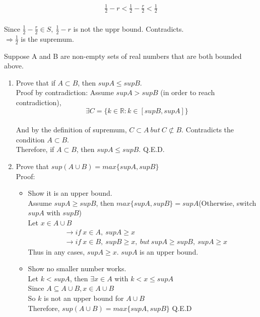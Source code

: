 \documentclass[]{exam}
\begin{document}
\begin{questions}
\begin{enumerate}[label = (\alph*)]
\begin{itemize}
\begin{itemize}
\begin{gather*}
			\frac{1}{2} - r < \frac{1}{2} - \frac{r}{2} < \frac{1}{2}
			\end{gather*}
			\\ Since $\frac{1}{2} - \frac{r}{2} \in S,\ \frac{1}{2} - r$ is not the uppr bound. Contradicts.
			\\ $\Rightarrow \frac{1}{2}$ is the supremum.
		\end{itemize}
	\end{itemize}
\end{enumerate}
\question Suppose A and B are non-empty sets of real numbers that are both bounded above.
\begin{enumerate}[label = (\alph*)]
	\item Prove that if $A \subset B$, then $supA \leq supB$.
	\\ Proof by contradiction: Assume $supA > supB$ (in order to reach contradiction), 
	\begin{equation*}
	\exists C = \{k \in \mathbb{R}: k \in [supB, supA]\}
	\end{equation*}
	\\ And by the definition of supremum, $C \subset A \ but\  C \not \subset B$. Contradicts the condition $A \subset B$.
	\\ Therefore, if $A \subset B$, then $supA \leq supB$. Q.E.D.

	\item Prove that $sup(A \cup B) = max\{supA, supB\}$
	\\ Proof:
	\begin{itemize}
		\item Show it is an upper bound.
		\\ Assume $supA \geq supB$, then $max\{supA, supB\} = supA$(Otherwise, switch $supA$ with $supB$)
		\\ Let $x \in A \cup B$
		\begin{align*}
		&\rightarrow if\ x \in A,\ supA \geq x \\
		&\rightarrow if\ x \in B,\ supB \geq x,\ but\ supA \geq supB,\ supA \geq x
		\end{align*}
		 Thus in any cases, $supA \geq x$. $supA$ is an upper bound.

		\item Show no smaller number works.
		\\ Let $k < supA$, then $\exists x \in A$ with $k < x \leq supA$
		\\ Since $A \subseteq A \cup B, x \in A \cup B$
		\\ So $k$ is not an upper bound for $A \cup B$
		\\ Therefore, $sup(A \cup B) = max\{supA, supB\}$ Q.E.D
	\end{itemize}


\end{enumerate}
\end{questions}
\end{document}
